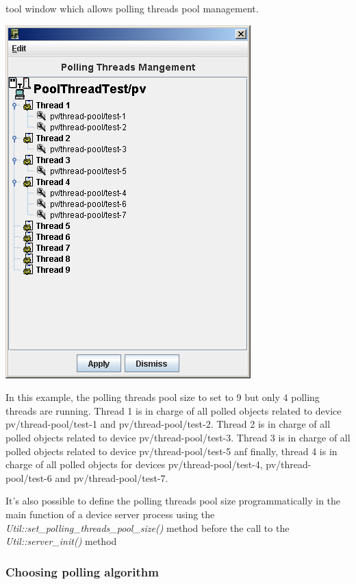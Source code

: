 tool window which allows polling threads pool management.\begin{center}\includegraphics{advanced/ThreadsManagement}\end{center}

In this example, the polling threads pool size to set to 9 but only
4 polling threads are running. Thread 1 is in charge of all polled
objects related to device pv/thread-pool/test-1 and pv/thread-pool/test-2.
Thread 2 is in charge of all polled objects related to device pv/thread-pool/test-3.
Thread 3 is in charge of all polled objects related to device pv/thread-pool/test-5
anf finally, thread 4 is in charge of all polled objects for devices
pv/thread-pool/test-4, pv/thread-pool/test-6 and pv/thread-pool/test-7.

It's also possible to define the polling threads pool size programmatically
in the main function of a device server process using the \emph{Util::set\_polling\_threads\_pool\_size()}
method before the call to the \emph{Util::server\_init()} method

\subsubsection{Choosing polling algorithm}


